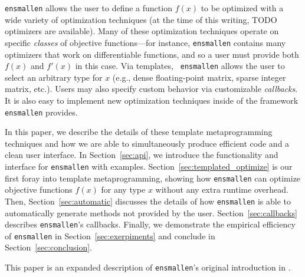 {\tt ensmallen} allows the user to define a function $f(x)$ to be optimized with
a wide variety of optimization techniques (at the time of this writing, TODO
optimizers are available).  Many of these optimization techniques operate on
specific {\it classes} of objective functions---for instance, {\tt ensmallen}
contains many optimizers that work on differentiable functions, and so a user
must provide both $f(x)$ and $f'(x)$ in this case.  Via templates, {\tt
ensmallen} allows the user to select an arbitrary type for $x$ (e.g., dense
floating-point matrix, sparse integer matrix, etc.).  Users may also specify
custom behavior via customizable {\it callbacks}.  It is also easy to implement
new optimization techniques inside of the framework {\tt ensmallen} provides.

In this paper, we describe the details of these template metaprogramming
techniques and how we are able to simultaneously produce efficient code and a
clean user interface.  In Section~\ref{sec:api}, we introduce the functionality
and interface for {\tt ensmallen} with examples.
Section~\ref{sec:templated_optimize} is our first foray into template
metaprogramming, showing how {\tt ensmallen} can optimize objective functions
$f(x)$ for any type $x$ without any extra runtime overhead.  Then,
Section~\ref{sec:automatic} discusses the details of how {\tt ensmallen} is able
to automatically generate methods not provided by the user.
Section~\ref{sec:callbacks} describes {\tt ensmallen}'s callbacks.
Finally, we demonstrate the empirical efficiency of {\tt ensmallen} in
Section~\ref{sec:exerpiments} and conclude in Section~\ref{sec:conclusion}.

This paper is an expanded description of {\tt ensmallen}'s original introduction
in \citet{TODO, TODO}.
